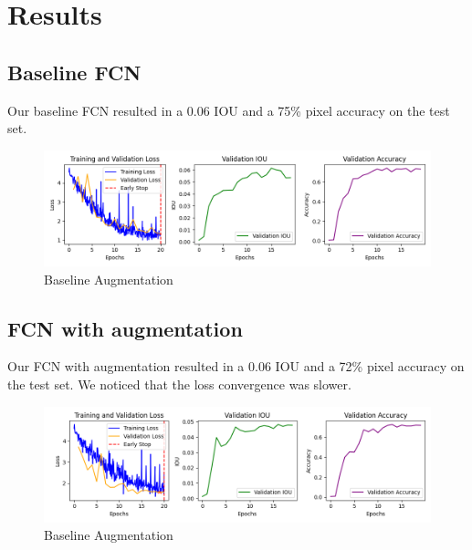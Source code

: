 \section*{Results}


\subsection{Baseline FCN}

Our baseline FCN resulted in a 0.06 IOU and a 75\% pixel accuracy on the test set.

\begin{figure}[H]
	\centering
	\includegraphics[width=\textwidth]{plots/baseline}
	\caption{Baseline Augmentation}
	\label{fig:baseline}
\end{figure}

\subsection{FCN with augmentation}

Our FCN with augmentation resulted in a 0.06 IOU and a 72\% pixel accuracy on the test set. We noticed that the loss convergence
was slower.

\begin{figure}[H]
	\centering
	\includegraphics[width=\textwidth]{plots/baseline_augmentation}
	\caption{Baseline Augmentation}
	\label{fig:baseline_aug}
\end{figure}

